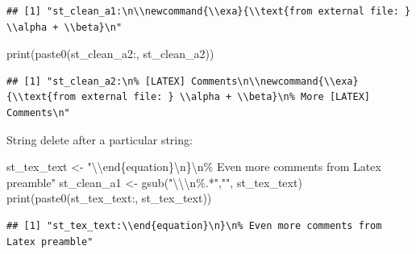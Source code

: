 \documentclass[
]{book}
\newenvironment{Shaded}{\begin{snugshade}}{\end{snugshade}}
\newcommand{\FunctionTok}[1]{\textcolor[rgb]{0.00,0.00,0.00}{#1}}
\newcommand{\NormalTok}[1]{#1}
\newcommand{\OtherTok}[1]{\textcolor[rgb]{0.56,0.35,0.01}{#1}}
\newcommand{\SpecialCharTok}[1]{\textcolor[rgb]{0.00,0.00,0.00}{#1}}
\newcommand{\StringTok}[1]{\textcolor[rgb]{0.31,0.60,0.02}{#1}}
\begin{document}
\begin{verbatim}
## [1] "st_clean_a1:\n\\newcommand{\\exa}{\\text{from external file: } \\alpha + \\beta}\n"
\end{verbatim}

\begin{Shaded}
\begin{Highlighting}[]
\FunctionTok{print}\NormalTok{(}\FunctionTok{paste0}\NormalTok{(}\StringTok{\textquotesingle{}st\_clean\_a2:\textquotesingle{}}\NormalTok{, st\_clean\_a2))}
\end{Highlighting}
\end{Shaded}

\begin{verbatim}
## [1] "st_clean_a2:\n% [LATEX] Comments\n\\newcommand{\\exa}{\\text{from external file: } \\alpha + \\beta}\n% More [LATEX] Comments\n"
\end{verbatim}

String delete after a particular string:

\begin{Shaded}
\begin{Highlighting}[]
\NormalTok{st\_tex\_text }\OtherTok{\textless{}{-}} \StringTok{"}\SpecialCharTok{\textbackslash{}\textbackslash{}}\StringTok{end\{equation\}}\SpecialCharTok{\textbackslash{}n}\StringTok{\}}\SpecialCharTok{\textbackslash{}n}\StringTok{\% Even more comments from Latex preamble"}
\NormalTok{st\_clean\_a1 }\OtherTok{\textless{}{-}} \FunctionTok{gsub}\NormalTok{(}\StringTok{"}\SpecialCharTok{\textbackslash{}\textbackslash{}\textbackslash{}n}\StringTok{\%.*"}\NormalTok{,}\StringTok{""}\NormalTok{, st\_tex\_text)}
\FunctionTok{print}\NormalTok{(}\FunctionTok{paste0}\NormalTok{(}\StringTok{\textquotesingle{}st\_tex\_text:\textquotesingle{}}\NormalTok{, st\_tex\_text))}
\end{Highlighting}
\end{Shaded}

\begin{verbatim}
## [1] "st_tex_text:\\end{equation}\n}\n% Even more comments from Latex preamble"
\end{verbatim}
\end{document}
